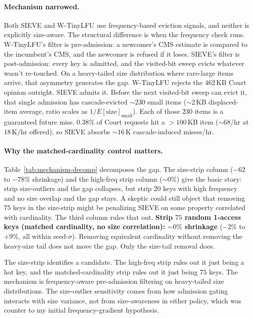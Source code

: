 \documentclass[letterpaper,twocolumn,10pt]{article}
\begin{document}
\paragraph{Mechanism narrowed.} Both SIEVE and W-TinyLFU use
frequency-based eviction signals, and neither is explicitly
size-aware. The structural difference is when the frequency
check runs. W-TinyLFU's filter is pre-admission: a newcomer's CMS
estimate is compared to the incumbent's CMS, and the newcomer is
refused if it loses. SIEVE's filter is post-admission: every key is
admitted, and the visited-bit sweep evicts whatever wasn't
re-touched.
On a heavy-tailed size distribution where rare-large items arrive,
that asymmetry generates the gap. W-TinyLFU rejects the $462$\,KB
Court opinion outright. SIEVE admits it. Before the next
visited-bit sweep can evict it, that single admission has
cascade-evicted $\sim 230$ small items ($\sim 2$\,KB displaced-item
average, ratio scales as $1/E[\text{size}]_{\text{small}}$). Each
of those $230$ items is a guaranteed future miss. $0.38\%$ of
Court requests hit a $>100$\,KB item ($\sim 68$/hr at $18$\,K/hr
offered), so SIEVE absorbs $\sim 16$\,K cascade-induced misses/hr.
\paragraph{Why the matched-cardinality control matters.}
Table~\ref{tab:mechanism-decomp} decomposes the gap. The size-strip
column ($-62$ to $-78\%$ shrinkage) and the high-freq strip column
($\sim 0\%$) give the basic story: strip size-outliers and the gap
collapses, but strip $20$ keys with high frequency and no size
overlap and the gap stays. A skeptic could still object that
removing $75$ keys in the size-strip might be penalizing SIEVE on
some property correlated with cardinality. The third column rules
that out. \textbf{Strip $75$ random 1-access keys (matched
cardinality, no size correlation): $\sim 0\%$ shrinkage} ($-2\%$
to $+9\%$, all within seed-$\sigma$). Removing equivalent
cardinality without removing the heavy-size tail does not move the
gap. Only the size-tail removal does.

The size-strip identifies a candidate. The high-freq strip rules
out it just being a hot key, and the matched-cardinality strip rules
out it just being $75$ keys. The mechanism is frequency-aware
pre-admission filtering on heavy-tailed size distributions. The
size-outlier sensitivity comes from how admission gating
interacts with size variance, not from size-awareness in either
policy, which was counter to my initial frequency-gradient hypothesis.
\end{document}
